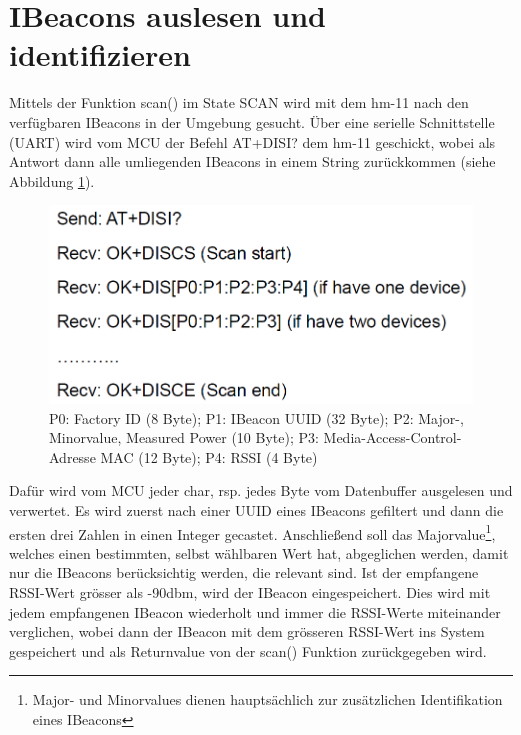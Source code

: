\section{IBeacons auslesen und identifizieren}
Mittels der Funktion scan() im State SCAN wird mit dem hm-11 nach den verfügbaren IBeacons in der Umgebung gesucht. Über eine serielle Schnittstelle (UART) wird vom MCU der Befehl AT+DISI? dem hm-11 geschickt, wobei als Antwort dann alle umliegenden IBeacons in einem String zurückkommen (siehe Abbildung \ref{fig:disiCommand}).
\begin{figure}[h]
\centering
\includegraphics[scale=0.7]{Bilder/disi_command.PNG} 
\caption[Rückgabe des AT+DISI? Befehls]{P0: Factory ID (8 Byte); P1: IBeacon UUID (32 Byte); P2: Major-, Minorvalue, Measured Power (10 Byte); P3: Media-Access-Control-Adresse MAC (12 Byte); P4: RSSI (4 Byte) \cite{hm11Datasheet}}
\label{fig:disiCommand}
\end{figure}
Dafür wird vom MCU jeder char, rsp. jedes Byte vom Datenbuffer ausgelesen und verwertet. Es wird zuerst nach einer UUID eines IBeacons gefiltert und dann die ersten drei Zahlen in einen Integer gecastet. Anschließend soll das Majorvalue\footnote{Major- und Minorvalues dienen hauptsächlich zur zusätzlichen Identifikation eines IBeacons}, welches einen bestimmten, selbst wählbaren Wert hat, abgeglichen werden, damit nur die IBeacons berücksichtig werden, die relevant sind. Ist der empfangene RSSI-Wert grösser als -90dbm, wird der IBeacon eingespeichert. Dies wird mit jedem empfangenen IBeacon wiederholt und immer die RSSI-Werte miteinander verglichen, wobei dann der IBeacon mit dem grösseren RSSI-Wert ins System gespeichert und als Returnvalue von der scan() Funktion zurückgegeben wird.

